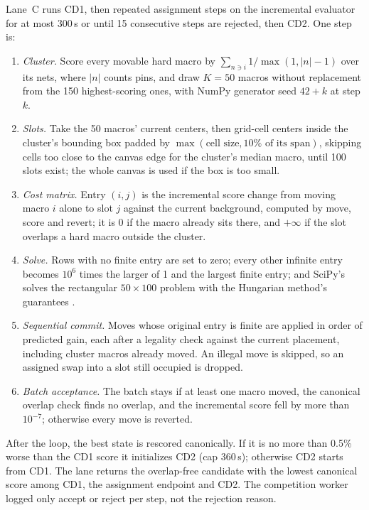 Lane~C runs CD1, then repeated assignment steps on the incremental evaluator for at
most 300\,s or until 15 consecutive steps are rejected, then CD2. One step is:
\begin{enumerate}
  \item \emph{Cluster.} Score every movable hard macro by
        $\sum_{n\ni i}1/\max(1,|n|-1)$ over its nets, where $|n|$ counts pins, and
        draw $K=50$ macros without replacement from the 150 highest-scoring ones,
        with NumPy generator seed $42+k$ at step $k$.
  \item \emph{Slots.} Take the 50 macros' current centers, then grid-cell centers
        inside the cluster's bounding box padded by $\max(\text{cell size},
        10\%\text{ of its span})$, skipping cells too close to the canvas edge for the
        cluster's median macro, until 100 slots exist; the whole canvas is used if the
        box is too small.
  \item \emph{Cost matrix.} Entry $(i,j)$ is the incremental score change from
        moving macro $i$ alone to slot $j$ against the current background, computed
        by move, score and revert; it is 0 if the macro already sits there, and
        $+\infty$ if the slot overlaps a hard macro outside the cluster.
  \item \emph{Solve.} Rows with no finite entry are set to zero; every other
        infinite entry becomes $10^6$ times the larger of 1 and the largest finite
        entry; and SciPy's
         solves the rectangular $50\times100$
        problem with the Hungarian method's guarantees \citep{kuhn1955hungarian}.
  \item \emph{Sequential commit.} Moves whose original entry is finite are applied
        in order of predicted gain, each after a legality check against the
        current placement, including cluster macros already moved. An illegal move
        is skipped, so an assigned swap into a slot still occupied is dropped.
  \item \emph{Batch acceptance.} The batch stays if at least one macro moved, the
        canonical overlap check finds no overlap, and the incremental score fell by
        more than $10^{-7}$; otherwise every move is reverted.
\end{enumerate}
After the loop, the best state is rescored canonically. If it is no more than
0.5\% worse than the CD1 score it initializes CD2 (cap 360\,s); otherwise CD2 starts
from CD1. The lane returns the overlap-free candidate with the lowest canonical score
among CD1, the assignment endpoint and CD2. The competition worker logged only
accept or reject per step, not the rejection reason.

